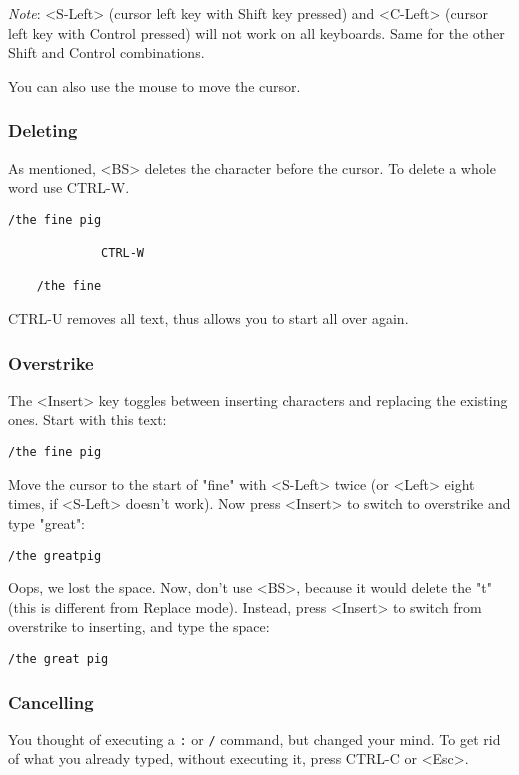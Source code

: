 \emph{Note}:
<S-Left> (cursor left key with Shift key pressed) and <C-Left> (cursor left key with Control pressed) will not work on all keyboards.
Same for the other Shift and Control combinations.

You can also use the mouse to move the cursor.
\subsubsection{Deleting}
As mentioned, <BS> deletes the character before the cursor.  To delete a whole
word use CTRL-W.

\begin{Verbatim}[samepage=true]
    /the fine pig 

             CTRL-W

    /the fine 
\end{Verbatim}

CTRL-U removes all text, thus allows you to start all over again.
\subsubsection{Overstrike}
The <Insert> key toggles between inserting characters and replacing the existing ones.
Start with this text:

\begin{Verbatim}[samepage=true]
    /the fine pig 
\end{Verbatim}

Move the cursor to the start of "fine" with <S-Left> twice (or <Left> eight times, if <S-Left> doesn't work).
Now press <Insert> to switch to overstrike and type "great":

\begin{Verbatim}[samepage=true]
    /the greatpig 
\end{Verbatim}

Oops, we lost the space.
Now, don't use <BS>, because it would delete the "t" (this is different from Replace mode).
Instead, press <Insert> to switch from overstrike to inserting, and type the space:

\begin{Verbatim}[samepage=true]
    /the great pig 
\end{Verbatim}

\subsubsection{Cancelling}
You thought of executing a \texttt{:} or \texttt{/} command, but changed your mind.
To get rid of what you already typed, without executing it, press CTRL-C or <Esc>.

